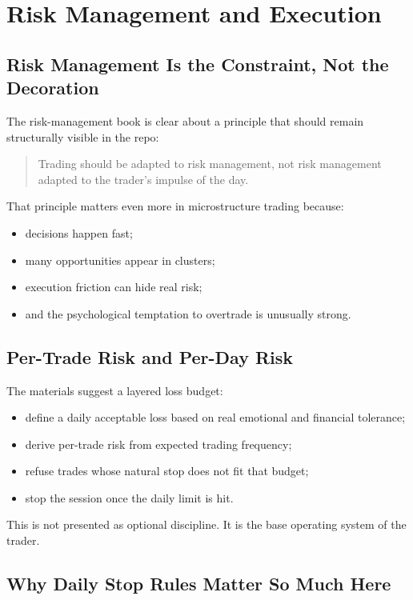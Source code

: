 \section{Risk Management and Execution}

\subsection{Risk Management Is the Constraint, Not the Decoration}

The risk-management book is clear about a principle that should remain structurally visible in the repo:
\begin{quote}
Trading should be adapted to risk management, not risk management adapted to the trader's impulse of the day.
\end{quote}

That principle matters even more in microstructure trading because:
\begin{itemize}
  \item decisions happen fast;
  \item many opportunities appear in clusters;
  \item execution friction can hide real risk;
  \item and the psychological temptation to overtrade is unusually strong.
\end{itemize}

\subsection{Per-Trade Risk and Per-Day Risk}

The materials suggest a layered loss budget:
\begin{itemize}
  \item define a daily acceptable loss based on real emotional and financial tolerance;
  \item derive per-trade risk from expected trading frequency;
  \item refuse trades whose natural stop does not fit that budget;
  \item stop the session once the daily limit is hit.
\end{itemize}

This is not presented as optional discipline.
It is the base operating system of the trader.

\subsection{Why Daily Stop Rules Matter So Much Here}

